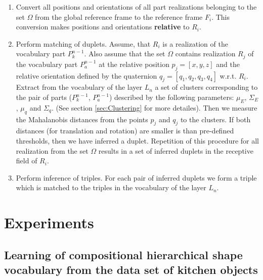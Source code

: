 \documentclass[conference]{IEEEtran}
\begin{document}
{\begin{enumerate}
\item Convert all positions and orientations of all part realizations
belonging to the set $\Omega$ from the global reference frame to the
reference frame $F_i$. This conversion makes positions and
orientations \textbf{relative} to $R_i$.

\item Perform matching of duplets. Assume, that $R_i$ is a
realization of the vocabulary part $P_k^{n-1}$. Also assume that the
set $\Omega$ contains realization $R_j$ of the vocabulary part
$P_a^{n-1}$ at the relative position $p_j = [x,y,z]$ and the
relative orientation defined by the quaternion $q_j = [q_1, q_2,
q_3, q_4]$ w.r.t. $R_i$. Extract from the vocabulary of the layer
$L_n$ a set of clusters corresponding to the pair of parts
($P_k^{n-1}$, $P_a^{n-1}$) described by the following parameters:
$\mu_E$, $\Sigma_E$, $\mu_q$ and $\Sigma_q$. (See section
\ref{sec:Clustering} for more detailes). Then we measure the
Mahalanobis distances from the points $p_j$ and $q_j$ to the
clusters. If both distances (for translation and rotation) are
smaller is than pre-defined thresholds, then we have inferred a
duplet. Repetition of this procedure for all realization from the
set $\Omega$ results in a set of inferred duplets in the receptive
field of $R_i$.

\item Perform inference of triples. For each pair of inferred duplets we form a triple which is matched to the
triples in the vocabulary of the layer $L_n$.


\end{enumerate}

\section{Experiments \label{sec:Experiments}}

\subsection{Learning of compositional hierarchical shape vocabulary from the data set of kitchen objects\label{sec:DataSet}}

}
\end{document}
